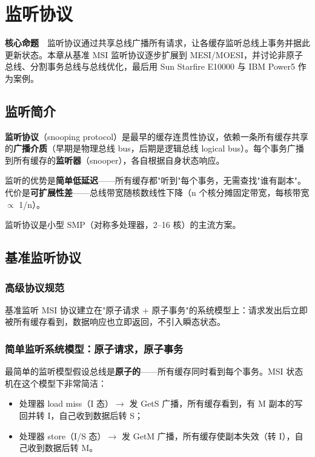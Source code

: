 \chapter{监听协议}

\begin{epigraph}
\textbf{核心命题}　监听协议通过共享总线广播所有请求，让各缓存监听总线上事务并据此更新状态。本章从基准 MSI 监听协议逐步扩展到 MESI/MOESI，并讨论非原子总线、分割事务总线与总线优化，最后用 Sun Starfire E10000 与 IBM Power5 作为案例。
\end{epigraph}



\section{监听简介}

\textbf{监听协议}（snooping protocol）是最早的缓存连贯性协议，依赖一条所有缓存共享的\textbf{广播介质}（早期是物理总线 bus，后期是逻辑总线 logical bus）。每个事务广播到所有缓存的\textbf{监听器}（snooper），各自根据自身状态响应。

监听的优势是\textbf{简单低延迟}——所有缓存都"听到"每个事务，无需查找"谁有副本"。代价是\textbf{可扩展性差}——总线带宽随核数线性下降（n 个核分摊固定带宽，每核带宽 $\propto$ 1/n）。

监听协议是小型 SMP（对称多处理器，2–16 核）的主流方案。

\section{基准监听协议}

\subsection{高级协议规范}

基准监听 MSI 协议建立在"原子请求 + 原子事务"的系统模型上：请求发出后立即被所有缓存看到，数据响应也立即返回，不引入瞬态状态。

\subsection{简单监听系统模型：原子请求，原子事务}

最简单的监听模型假设总线是\textbf{原子的}——所有缓存同时看到每个事务。MSI 状态机在这个模型下非常简洁：

\begin{itemize}
\item 处理器 load miss（I 态）$\rightarrow$ 发 GetS 广播，所有缓存看到，有 M 副本的写回并转 I，自己收到数据后转 S；
\item 处理器 store（I/S 态）$\rightarrow$ 发 GetM 广播，所有缓存使副本失效（转 I），自己收到数据后转 M。
\end{itemize}


